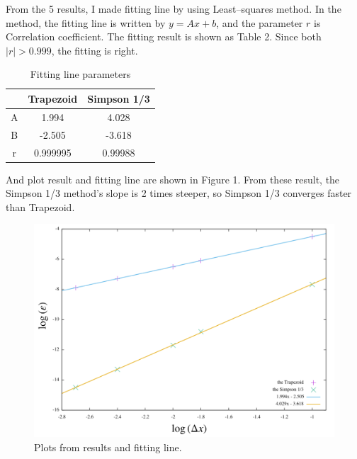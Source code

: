 \documentclass[a4paper,11pt]{article}
\begin{document}
From the 5 results, I made fitting line by using Least–squares method. In the method, the fitting line is written by $y = Ax + b$, and the parameter $r$ is Correlation coefficient. The fitting result is shown as Table 2. Since both $|r| > 0.999$, the fitting is right.

\begin{table}[H]
\centering
\caption{Fitting line parameters}
\begin{tabular}{c|cc}
   & Trapezoid & Simpson 1/3 \\
  \hline
  A & 1.994 & 4.028 \\
  B& -2.505 & -3.618 \\
  r& 0.999995 & 0.99988 
\end{tabular}
\end{table}

And plot result and fitting line are shown in Figure 1. From these result, the Simpson 1/3 method's slope is 2 times steeper, so Simpson 1/3 converges faster than Trapezoid.

\begin{figure}[H]
	\centering
	\includegraphics[width=12cm]{plot.png}
	\caption{Plots from results and fitting line.} 
\end{figure}


%
\end{document}
